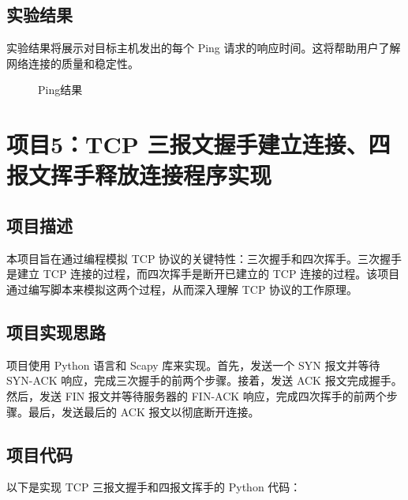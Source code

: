 \documentclass[UTF8,titlepage]{ctexart}
\numberwithin{figure}{section}
\begin{document}
\subsection{实验结果}

实验结果将展示对目标主机发出的每个 Ping 请求的响应时间。这将帮助用户了解网络连接的质量和稳定性。
\begin{figure}[H]
\centering
 \caption{Ping结果}
 \label{}
\end{figure}

\clearpage
\section{项目5：TCP 三报文握手建立连接、四报文挥手释放连接程序实现}

\subsection{项目描述}
本项目旨在通过编程模拟 TCP 协议的关键特性：三次握手和四次挥手。三次握手是建立 TCP 连接的过程，而四次挥手是断开已建立的 TCP 连接的过程。该项目通过编写脚本来模拟这两个过程，从而深入理解 TCP 协议的工作原理。

\subsection{项目实现思路}
项目使用 Python 语言和 Scapy 库来实现。首先，发送一个 SYN 报文并等待 SYN-ACK 响应，完成三次握手的前两个步骤。接着，发送 ACK 报文完成握手。然后，发送 FIN 报文并等待服务器的 FIN-ACK 响应，完成四次挥手的前两个步骤。最后，发送最后的 ACK 报文以彻底断开连接。

\subsection{项目代码}
以下是实现 TCP 三报文握手和四报文挥手的 Python 代码：
\end{document}
